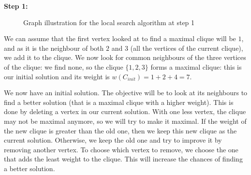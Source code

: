 \begin{minipage}{\linewidth}
    \textbf{Step 1:} \newline
    
    \begin{minipage}{0.4\textwidth}
        \begin{figure}[H]
            \centering
            \caption{Graph illustration for the local search algorithm at step 1}
            \label{fig:local-search-mewc-init-1}
        \end{figure}
    \end{minipage}
    \begin{minipage}{0.6\textwidth}
        We can assume that the first vertex looked at to find a maximal clique will 
        be $1$, and as it is the neighbour of both $2$ and $3$ (all the vertices of 
        the current clique), we add it to the clique. We now look for common 
        neighbours of the three vertices of the clique: we find none, so the 
        clique $\{1, 2, 3\}$ forms a maximal clique: this is our initial solution 
        and its weight is $w(C_{init}) = 1+2+4 = 7$.
    \end{minipage}
\end{minipage}

\bigskip

We now have an initial solution. The objective will be to look at its neighbours to 
find a better solution (that is a maximal clique with a higher weight). This is done 
by deleting a vertex in our current solution. With one less vertex, the clique may 
not be maximal anymore, so we will try to make it maximal. If the weight of the new 
clique is greater than the old one, then we keep this new clique as the current 
solution. Otherwise, we keep the old one and try to improve it by removing another 
vertex. To choose which vertex to remove, we choose the one that adds the least 
weight to the clique. This will increase the chances of finding a better solution.

